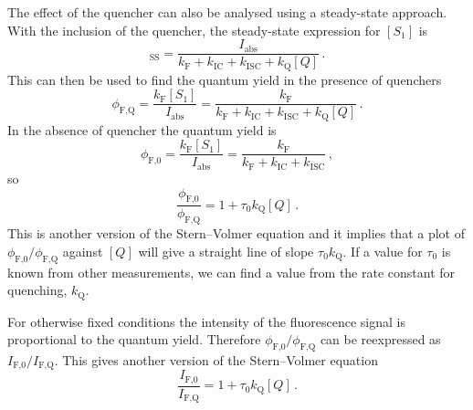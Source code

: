 \documentclass{article}
\theoremstyle{plain}\theoremheaderfont{\normalfont\itshape}\theorembodyfont{\rmfamily}\theoremseparator{.}\newtheorem*{rem}{Remark}\newtheorem*{ex}{Example}\newtheorem*{proof}{Proof}\newtheorem*{altp}{Alternative proof}
\theoremstyle{plain}\theoremheaderfont{\normalfont\bfseries}\theorembodyfont{\rmfamily}\theoremseparator{.}\newtheorem{thm}{Theorem}[section]\newtheorem{lem}[thm]{Lemma}\newtheorem{prop}[thm]{Proposition}\newtheorem*{cor}{Corollary}\newtheorem{defn}[thm]{Definition}\newtheorem{clm}[thm]{Claim}\newtheorem{clminproof}{Claim}\newtheorem{pos}{Postulate}[section]
\theoremstyle{break}\theoremheaderfont{\normalfont\itshape}\theorembodyfont{\rmfamily}\theoremseparator{.\medskip}\newtheorem*{proofskip}{Proof}\newtheorem*{exs}{Examples}\newtheorem*{rems}{Remarks}
\theoremstyle{break}\theoremheaderfont{\normalfont\bfseries}\theorembodyfont{\rmfamily}\theoremseparator{.\medskip}\newtheorem{lemskip}[thm]{Lemma}\newtheorem{defnskip}[thm]{Definition}\newtheorem{propskip}[thm]{Proposition}\newtheorem{thmskip}[thm]{Theorem}
\numberwithin{equation}{section}
\newcommand{\FF}{_{\text{F}}}
\newcommand{\IC}{_{\text{IC}}}
\newcommand{\ISC}{_{\text{ISC}}}
\newcommand{\QQ}{_{\text{Q}}}
\begin{document}
    The effect of the quencher can also be analysed using a steady-state approach. With the inclusion of the quencher, the steady-state expression for \([S_1]\) is
    \begin{equation}
        [S_1]_{\text{SS}}=\frac{I_{\text{abs}}}{k\FF+k\IC+k\ISC+k\QQ[Q]}\,.
    \end{equation}
    This can then be used to find the quantum yield in the presence of quenchers
    \begin{equation}
        \phi_{\text{F,Q}}=\frac{k\FF[S_1]}{I_{\text{abs}}}=\frac{k\FF}{k\FF+k\IC+k\ISC+k\QQ[Q]}\,.
    \end{equation}
    In the absence of quencher the quantum yield is
    \begin{equation}
        \phi_{\text{F,0}}=\frac{k\FF[S_1]}{I_{\text{abs}}}=\frac{k\FF}{k\FF+k\IC+k\ISC}\,,
    \end{equation}
    so
    \begin{equation}
        \frac{\phi_{\text{F,0}}}{\phi_{\text{F,Q}}}=1+\tau_0 k\QQ[Q]\,.
    \end{equation}
    This is another version of the Stern--Volmer equation and it implies that a plot of \(\phi_{\text{F,0}}/\phi_{\text{F,Q}}\) against \([Q]\) will give a straight line of slope \(\tau_0 k\QQ\). If a value for \(\tau_0\) is known from other measurements, we can find a value from the rate constant for quenching, \(k\QQ\).
    
    For otherwise fixed conditions the intensity of the fluorescence signal is proportional to the quantum yield. Therefore \(\phi_{\text{F,0}}/\phi_{\text{F,Q}}\) can be reexpressed as \(I_{\text{F,0}}/I_{\text{F,Q}}\). This gives another version of the Stern--Volmer equation
    \begin{equation}
        \frac{I_{\text{F,0}}}{I_{\text{F,Q}}}=1+\tau_0 k\QQ[Q]\,.
    \end{equation}
\end{document}
